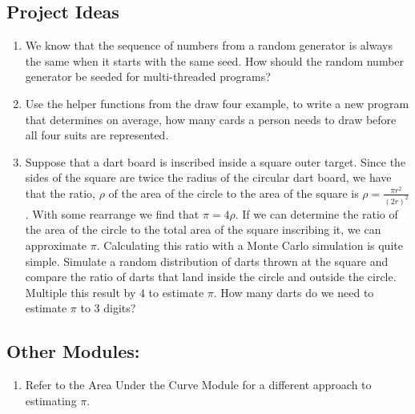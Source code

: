 \documentclass[a4paper, 11pt]{article}
\begin{document}
\subsection{Project Ideas}
\begin{enumerate}
\item We know that the sequence of numbers from a random generator is always the same when it starts with the same seed. How should the random number generator be seeded for multi-threaded programs?

\item Use the helper functions from the draw four example, to write a new program that determines on average, how many cards a person needs to draw before all four suits are represented.

\item Suppose that a dart board is inscribed inside a square outer target. Since the sides of the square are twice the radius of the circular dart board, we have that the ratio, $\rho$ of the area of the circle to the area of the square is $\rho = \frac{\pi {r}^2}{{\left( 2r \right)^2}}$. With some rearrange we find that $\pi = 4\rho$. If we can determine the ratio of the area of the circle to the total area of the square inscribing it, we can approximate $\pi$. Calculating this ratio with a Monte Carlo simulation is quite simple. Simulate a random distribution of darts thrown at the square and compare the ratio of darts that land inside the circle and outside the circle. Multiple this result by $4$ to estimate $\pi$. How many darts do we need to estimate $\pi$ to 3 digits?

\end{enumerate}
\subsection{Other Modules:}

\begin{enumerate}
\item Refer to the Area Under the Curve Module for a different approach to estimating $\pi$.
\end{enumerate}





\end{document}
